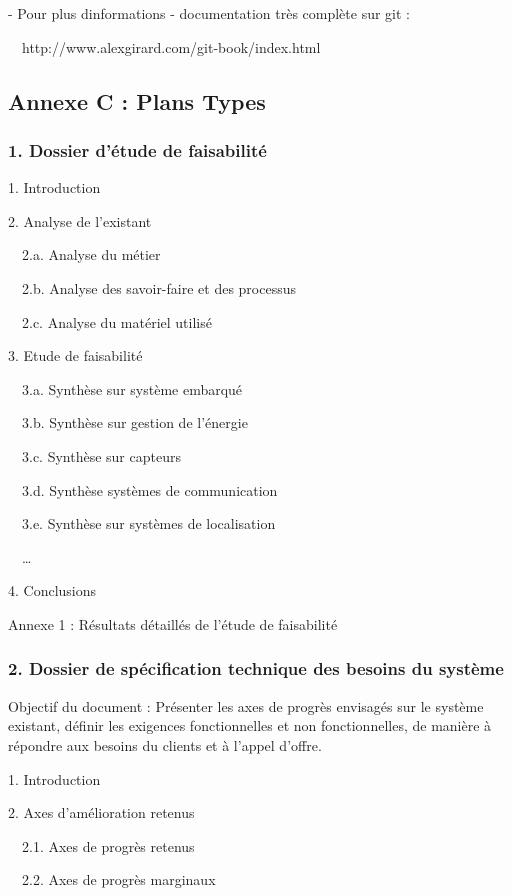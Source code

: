 \documentclass{article}
\begin{document}
\bigskip

{}- Pour plus d{\textquotesingle}informations - documentation très
complète sur git :

\ \ http://www.alexgirard.com/git-book/index.html


\bigskip

\subsection[Annexe C : Plans Types]{Annexe C : Plans Types}
\subsubsection[1. Dossier d’étude de faisabilité]{1. Dossier d’étude de
faisabilité}
1. Introduction

2. Analyse de l’existant

\ \ 2.a. Analyse du métier

\ \ 2.b. Analyse des savoir-faire et des processus

\ \ 2.c. Analyse du matériel utilisé

3. Etude de faisabilité

\ \ 3.a. Synthèse sur système embarqué

\ \ 3.b. Synthèse sur gestion de l’énergie

\ \ 3.c. Synthèse sur capteurs

\ \ 3.d. Synthèse systèmes de communication

\ \ 3.e. Synthèse sur systèmes de localisation

\ \ …

4. Conclusions

Annexe 1 : Résultats détaillés de l’étude de faisabilité

\subsubsection[2. Dossier de spécification technique des besoins du
système]{2. Dossier de spécification technique des besoins du système}
Objectif du document : Présenter les axes de progrès envisagés sur le
système existant, définir les exigences fonctionnelles et non
fonctionnelles, de manière à répondre aux besoins du clients et à
l’appel d’offre.

1. Introduction

2. Axes d’amélioration retenus

\ \ 2.1. Axes de progrès retenus

\ \ 2.2. Axes de progrès marginaux
\end{document}

